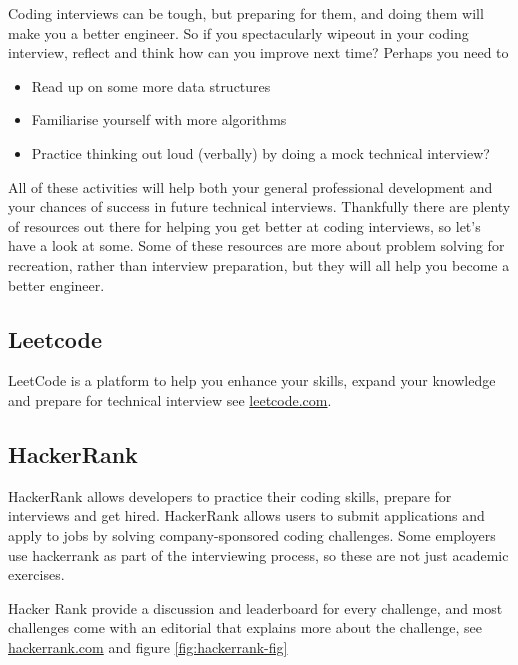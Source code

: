 \documentclass[
]{book}
\providecommand{\tightlist}{%
  \setlength{\itemsep}{0pt}\setlength{\parskip}{0pt}}
\begin{document}
Coding interviews can be tough, but preparing for them, and doing them will make you a better engineer. So if you spectacularly wipeout in your coding interview, reflect and think how can you improve next time? Perhaps you need to

\begin{itemize}
\tightlist
\item
  Read up on some more data structures
\item
  Familiarise yourself with more algorithms
\item
  Practice thinking out loud (verbally) by doing a mock technical interview?
\end{itemize}

All of these activities will help both your general professional development and your chances of success in future technical interviews. Thankfully there are plenty of resources out there for helping you get better at coding interviews, so let's have a look at some. Some of these resources are more about problem solving for recreation, rather than interview preparation, but they will all help you become a better engineer.

\hypertarget{leetcode}{%
\subsection{Leetcode}\label{leetcode}}

LeetCode is a platform to help you enhance your skills, expand your knowledge and prepare for technical interview see \href{https://leetcode.com}{leetcode.com}.

\hypertarget{hackerrank}{%
\subsection{HackerRank}\label{hackerrank}}

HackerRank allows developers to practice their coding skills, prepare for interviews and get hired. HackerRank allows users to submit applications and apply to jobs by solving company-sponsored coding challenges. Some employers use hackerrank as part of the interviewing process, so these are not just academic exercises.

Hacker Rank provide a discussion and leaderboard for every challenge, and most challenges come with an editorial that explains more about the challenge, see \href{https://www.hackerrank.com/}{hackerrank.com} and figure \ref{fig:hackerrank-fig}
\end{document}
